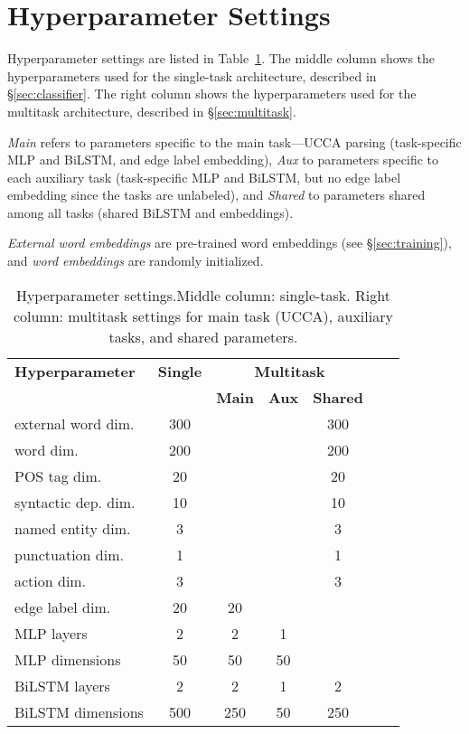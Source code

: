 \documentclass[11pt,a4paper]{article}
\begin{document}
\section{Hyperparameter Settings}\label{sec:hyperparams}
Hyperparameter settings are listed in Table~\ref{tab:hyperparams}.
The middle column shows the hyperparameters used for the single-task architecture,
described in \S\ref{sec:classifier}.
The right column shows the hyperparameters used for the multitask architecture,
described in \S\ref{sec:multitask}.

\textit{Main} refers to parameters specific to the main task---UCCA parsing
(task-specific MLP and BiLSTM, and edge label embedding),
\textit{Aux} to parameters specific to each auxiliary task
(task-specific MLP and BiLSTM, but no edge label embedding since the tasks are unlabeled),
and \textit{Shared} to parameters shared among all tasks
(shared BiLSTM and embeddings).

\textit{External word embeddings} are pre-trained word embeddings (see \S\ref{sec:training}),
and \textit{word embeddings} are randomly initialized.

\begin{table}[h]
\centering
\footnotesize
\begin{tabular}{l|c|ccccc}
\bf Hyperparameter &  \bf Single & \multicolumn{3}{c}{\bf Multitask} \\ 
&& \bf Main & \bf Aux & \bf Shared \\
\hline
external word dim. & 300 &&& 300 \\
word dim. & 200 &&& 200 \\
POS tag dim. & 20 &&& 20 \\
syntactic dep. dim. & 10 &&& 10 \\
named entity dim. & 3 &&& 3 \\
punctuation dim. & 1 &&& 1 \\
action dim. & 3 &&& 3 \\
edge label dim. & 20 & 20 \\
MLP layers & 2 & 2 & 1 \\
MLP dimensions & 50 & 50 & 50 \\
BiLSTM layers & 2 & 2 & 1 & 2 \\
BiLSTM dimensions & 500 & 250 & 50 & 250
\end{tabular}
\caption{Hyperparameter settings.\label{tab:hyperparams}
Middle column: single-task.
Right column: multitask settings for main task (UCCA), auxiliary tasks, and shared parameters.}
\end{table}



\end{document}
